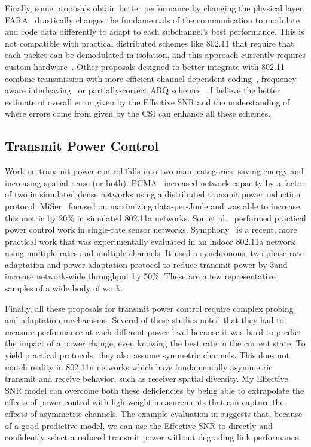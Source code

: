 Finally, some proposals obtain better performance by changing the physical layer. FARA~\cite{Rahul_FARA} drastically changes the fundamentals of the communication to modulate and code data differently to adapt to each subchannel's best performance. This is not compatible with practical distributed schemes like 802.11 that require that each packet can be demodulated in isolation, and this approach currently requires custom hardware~\cite{Rahul_SWIFT}. Other proposals designed to better integrate with 802.11 combine transmission with more efficient channel-dependent coding~\cite{Lin_ZipTX}, frequency-aware interleaving~\cite{Bhartia_FreqDiv} or partially-correct ARQ schemes~\cite{Jamieson_PPR}. I believe the better estimate of overall error given by the Effective SNR and the understanding of where errors come from given by the CSI can enhance all these schemes.

\subsection{Transmit Power Control}
Work on transmit power control falls into two main categories: saving energy and increasing spatial reuse (or both). PCMA~\cite{Monks_PowerMAC} increased network capacity by a factor of two in simulated dense networks using a distributed transmit power reduction protocol. MiSer~\cite{Qiao_MiSer} focused on maximizing data-per-Joule and was able to increase this metric by 20\% in simulated 802.11a networks. Son et al.~\cite{Son_PowerStudy} performed practical power control work in single-rate sensor networks. Symphony~\cite{Ramachandran_Symphony} is a recent, more practical work that was experimentally evaluated in an indoor 802.11a network using multiple rates and multiple channels. It used a synchronous, two-phase rate adaptation and power adaptation protocol to reduce transmit power by 3\dB and increase network-wide throughput by 50\%. These are a few representative samples of a wide body of work.

Finally, all these proposals for transmit power control require complex probing and adaptation mechanisms. Several of these studies noted that they had to measure performance at each different power level because it was hard to predict the impact of a power change, even knowing the best rate in the current state. To yield practical protocols, they also assume symmetric channels. This does not match reality in 802.11n networks which have fundamentally asymmetric transmit and receive behavior, such as receiver spatial diversity. My Effective SNR model can overcome both these deficiencies by being able to extrapolate the effects of power control with lightweight measurements that can capture the effects of asymmetric channels. The example evaluation in  suggests that, because of a good predictive model, we can use the Effective SNR to directly and confidently select a reduced transmit power without degrading link performance.

